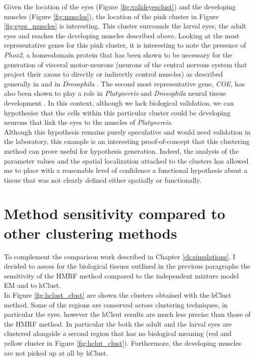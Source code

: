 	Given the location of the eyes (Figure \ref{fig:valideyesclust}) and the developing muscles (Figure \ref{fig:muscles}), the location of the pink cluster in Figure \ref{fig:eyes_muscles} is interesting. This cluster surrounds the larval eyes, the adult eyes and reaches the developing muscles described above. Looking at the most representative genes for this pink cluster, it is interesting to note the presence of {\it{Phox2}}, a homeodomain protein that has been shown to be necessary for the generation of visceral motor-neurons (neurons of the central nervous system that project their axons to directly or indirectly control muscles) as described generally in \cite{brunet02} and in \emph{Drosophila} \cite{briscoe99}. The second most representative gene, {\it{COE}}, has also been shown to play a role in \emph{Platynereis} and \emph{Drosophila} neural tissue development \cite{demilly11}. In this context, although we lack biological validation, we can hypothesise that the cells within this particular cluster could be developing neurons that link the eyes to the muscles of \emph{Platynereis}.\\
	
	 Although this hypothesis remains purely speculative and would need validation in the laboratory, this example is an interesting proof-of-concept that this clustering method can prove useful for hypothesis generation. Indeed, the analysis of the parameter values and the spatial localization attached to the clusters has allowed me to place with a reasonable level of confidence a functional hypothesis about a tissue that was not clearly defined either spatially or functionally. \\
	 
\section{Method sensitivity compared to other clustering methods}
	To complement the comparison work described in Chapter \ref{ch:simulations}, I decided to assess for the biological tissues outlined in the previous paragraphs the sensitivity of the HMRF method compared to the independent mixture model EM and to hClust.\\
	
	In Figure \ref{fig:hclust_clust} are shown the clusters obtained with the hClust method. Some of the regions are conserved across clustering techniques, in particular the eyes. however the hClsut results are much less precise than those of the HMRF method. In particular the both the adult and the larval eyes are clustered alongside a second region that has no biological meaning (red and yellow cluster in Figure \ref{fig:hclut_clust}). Furthermore, the developing muscles are not picked up at all by hClust.
	

